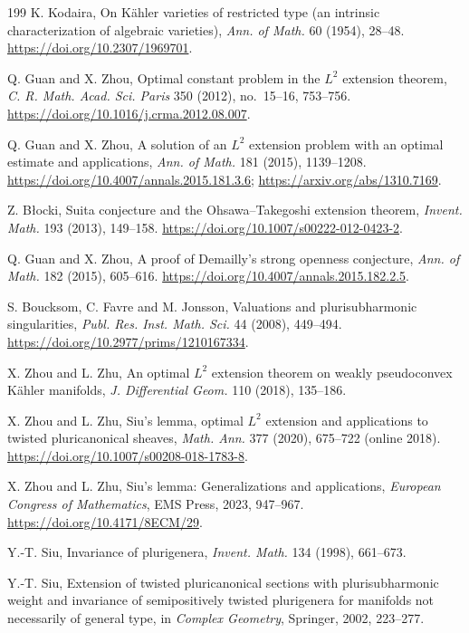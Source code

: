 \documentclass[11pt,reqno]{amsart}
\theoremstyle{definition}
\theoremstyle{remark}
\begin{document}
\begin{thebibliography}{199}
 K. Kodaira, On K\"ahler varieties of restricted type (an intrinsic characterization of algebraic varieties), \emph{Ann. of Math.} 60 (1954), 28--48. \url{https://doi.org/10.2307/1969701}.

 Q. Guan and X. Zhou, Optimal constant problem in the $L^2$ extension theorem, \emph{C. R. Math. Acad. Sci. Paris} 350 (2012), no.~15--16, 753--756. \url{https://doi.org/10.1016/j.crma.2012.08.007}.

 Q. Guan and X. Zhou, A solution of an $L^2$ extension problem with an optimal estimate and applications, \emph{Ann. of Math.} 181 (2015), 1139--1208. \url{https://doi.org/10.4007/annals.2015.181.3.6}; \url{https://arxiv.org/abs/1310.7169}.

 Z. B\l ocki, Suita conjecture and the Ohsawa--Takegoshi extension theorem, \emph{Invent. Math.} 193 (2013), 149--158. \url{https://doi.org/10.1007/s00222-012-0423-2}.

 Q. Guan and X. Zhou, A proof of Demailly's strong openness conjecture, \emph{Ann. of Math.} 182 (2015), 605--616. \url{https://doi.org/10.4007/annals.2015.182.2.5}.

 S. Boucksom, C. Favre and M. Jonsson, Valuations and plurisubharmonic singularities, \emph{Publ. Res. Inst. Math. Sci.} 44 (2008), 449--494. \url{https://doi.org/10.2977/prims/1210167334}.

 X. Zhou and L. Zhu, An optimal $L^2$ extension theorem on weakly pseudoconvex K\"ahler manifolds, \emph{J. Differential Geom.} 110 (2018), 135--186.

 X. Zhou and L. Zhu, Siu's lemma, optimal $L^2$ extension and applications to twisted pluricanonical sheaves, \emph{Math. Ann.} 377 (2020), 675--722 (online 2018). \url{https://doi.org/10.1007/s00208-018-1783-8}.

 X. Zhou and L. Zhu, Siu's lemma: Generalizations and applications, \emph{European Congress of Mathematics}, EMS Press, 2023, 947--967. \url{https://doi.org/10.4171/8ECM/29}.

 Y.-T. Siu, Invariance of plurigenera, \emph{Invent. Math.} 134 (1998), 661--673.

 Y.-T. Siu, Extension of twisted pluricanonical sections with plurisubharmonic weight and invariance of semipositively twisted plurigenera for manifolds not necessarily of general type, in \emph{Complex Geometry}, Springer, 2002, 223--277.


\end{thebibliography}
\end{document}
